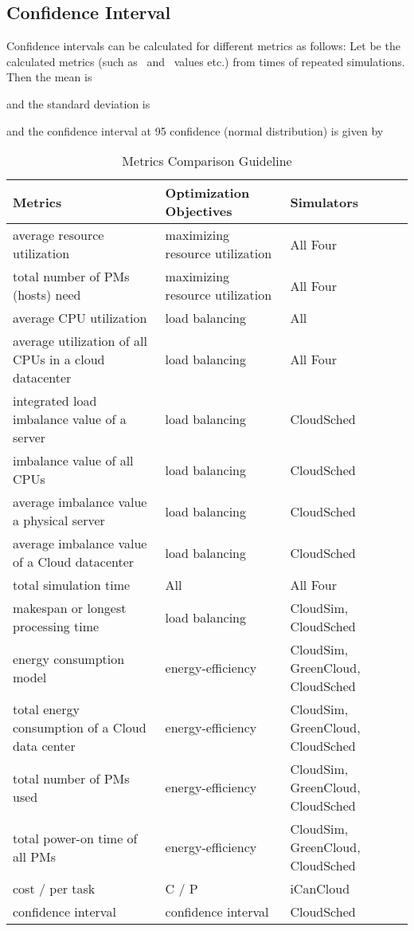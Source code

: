 \documentclass[3p, twocolumn]{elsarticle}
\begin{document}
\subsection {Confidence Interval}
Confidence intervals can be calculated for different metrics as follows: Let  be the calculated metrics (such as  ~and~  values etc.) from  times of repeated simulations. Then the mean is

and the standard deviation  is

and the confidence interval at 95 confidence (normal distribution) is given by

\begin{table*}
\scriptsize
\caption{Metrics Comparison Guideline}
\begin{center}
\begin{tabular}{l|l|l}
\hline Metrics &Optimization Objectives &Simulators
\\\hline
\hline average resource utilization & maximizing resource utilization & All Four \\
\hline total number of PMs (hosts) need & maximizing resource utilization & All Four \\
\hline average CPU utilization & load balancing & All \\
\hline average utilization of all CPUs in a cloud datacenter & load balancing & All Four\\
\hline integrated load imbalance value of a server & load balancing & CloudSched\\
\hline imbalance value of all CPUs & load balancing &  CloudSched\\
\hline average imbalance value a physical server  & load balancing & CloudSched \\
\hline average imbalance value of a Cloud datacenter & load balancing & CloudSched\\
\hline total simulation time &All & All Four\\
\hline makespan or longest processing time & load balancing& CloudSim, CloudSched\\
\hline energy consumption model& energy-efficiency& CloudSim, GreenCloud, CloudSched\\
\hline total energy consumption of a Cloud data center & energy-efficiency & CloudSim, GreenCloud, CloudSched\\
\hline total number of PMs used	& energy-efficiency& CloudSim, GreenCloud, CloudSched\\
\hline total power-on time of all PMs & energy-efficiency & CloudSim, GreenCloud, CloudSched\\
\hline cost / per task & C / P	& iCanCloud\\
\hline confidence interval & confidence interval & CloudSched\\
\hline
\end{tabular} \\
\end{center}
\end{table*}
\end{document}
